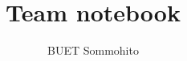 \documentclass[10,a4paper,portrait,twosided]{extarticle}
\title{Team notebook}
\author{BUET Sommohito}
\begin{document}
\renewcommand{\baselinestretch}{0.0}
\renewcommand{\baselinestretch}{.5}


\end{document}
